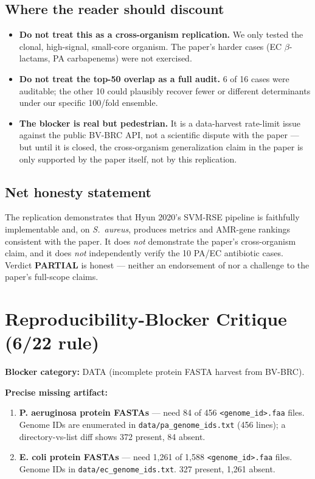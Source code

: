 \documentclass[11pt]{article}
\begin{document}
\subsection{Where the reader should discount}
\begin{itemize}
  \item \textbf{Do not treat this as a cross-organism replication.} We only tested the clonal, high-signal, small-core organism. The paper's harder cases (EC $\beta$-lactams, PA carbapenems) were not exercised.
  \item \textbf{Do not treat the top-50 overlap as a full audit.} 6 of 16 cases were auditable; the other 10 could plausibly recover fewer or different determinants under our specific 100/fold ensemble.
  \item \textbf{The blocker is real but pedestrian.} It is a data-harvest rate-limit issue against the public BV-BRC API, not a scientific dispute with the paper --- but until it is closed, the cross-organism generalization claim in the paper is only supported by the paper itself, not by this replication.
\end{itemize}

\subsection{Net honesty statement}
The replication demonstrates that Hyun 2020's SVM-RSE pipeline is faithfully implementable and, on \emph{S.\ aureus}, produces metrics and AMR-gene rankings consistent with the paper. It does \emph{not} demonstrate the paper's cross-organism claim, and it does \emph{not} independently verify the 10 PA/EC antibiotic cases. Verdict \textbf{PARTIAL} is honest --- neither an endorsement of nor a challenge to the paper's full-scope claims.

\section{Reproducibility-Blocker Critique (6/22 rule)}
\textbf{Blocker category:} DATA (incomplete protein FASTA harvest from BV-BRC).

\textbf{Precise missing artifact:}
\begin{enumerate}
  \item \textbf{P. aeruginosa protein FASTAs} --- need 84 of 456 \texttt{<genome\_id>.faa} files. Genome IDs are enumerated in \texttt{data/pa\_genome\_ids.txt} (456 lines); a directory-vs-list diff shows 372 present, 84 absent.
  \item \textbf{E. coli protein FASTAs} --- need 1{,}261 of 1{,}588 \texttt{<genome\_id>.faa} files. Genome IDs in \texttt{data/ec\_genome\_ids.txt}. 327 present, 1{,}261 absent.
\end{enumerate}
\end{document}
